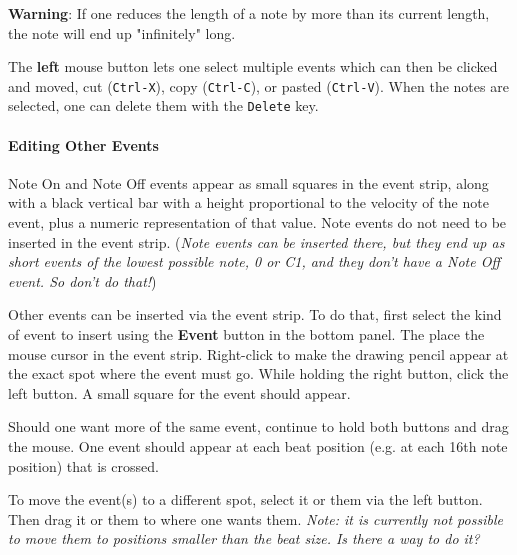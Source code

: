    \textbf{Warning}:  If one reduces the length of a note by more than its
   current length, the note will end up "infinitely" long.

	The \textbf{left} mouse button lets one select multiple events 
   which can then be clicked and moved,
   cut (\texttt{Ctrl-X}), 
   copy (\texttt{Ctrl-C}),
   or pasted (\texttt{Ctrl-V}).
   When the notes are selected,
   one can delete them with the \texttt{Delete} key.

\paragraph{Editing Other Events}
\label{paragraph:seq24_pattern_editor_other_events}


   Note On and Note Off events appear as small squares in the event strip,
   along with a black vertical bar with a height proportional to the
   velocity of the note event, plus a numeric representation of that value.
   Note events do not need to be inserted in the event strip.
   (\textsl{Note events can be inserted there, but they end up as short
   events of the lowest possible note, 0 or C1, and they don't have a Note
   Off event.  So don't do that!})

   Other events can be inserted via the event strip.  To do that, first
   select the kind of event to insert using the \textbf{Event} button in the
   bottom panel.  The place the mouse cursor in the event strip.
   Right-click to make the drawing pencil appear at the exact spot where the
   event must go.  While holding the right button, click the left button.
   A small square for the event should appear.

   Should one want more of the same event, continue to hold both buttons and
   drag the mouse.  One event should appear at each beat position (e.g. at
   each 16th note position) that is crossed.

   To move the event(s) to a different spot, select it or them via the left
   button.  Then drag it or them to where one wants them.
   \textsl{Note: it
   is currently not possible to move them to positions smaller than the
   beat size.  Is there a way to do it?}

